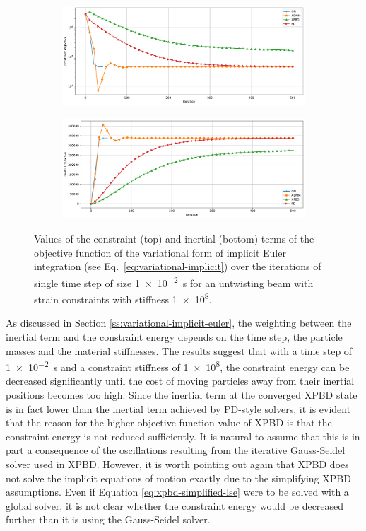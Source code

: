 \begin{figure}[h]
    \centering
    \begin{subfigure}{\textwidth}
        \includegraphics[width=\linewidth]{figures/strain_beam_untwist_constraintObjectives.pdf}
    \end{subfigure}
    \begin{subfigure}{\textwidth}
        \includegraphics[width=\linewidth]{figures/strain_beam_untwist_inertialObjectives.pdf}
    \end{subfigure}
    \caption{Values of the constraint (top) and inertial (bottom) terms of the objective function of the variational form of implicit Euler integration 
        (see Eq.\ \ref{eq:variational-implicit}) over the iterations of single time step of size \SI{1e-2}{\second} for an untwisting beam with strain 
    constraints with stiffness \num{1e8}.}
    \label{fig:strain-beam-untwist-objectives-split}
\end{figure}

As discussed in Section \ref{ss:variational-implicit-euler}, the weighting between the inertial term and the constraint energy depends on the time step, the particle masses 
and the material stiffnesses. The results suggest that with a time step of \SI{1e-2}{\second} and a constraint stiffness of \num{1e8}, the constraint energy can be 
decreased significantly until the cost of moving particles away from their inertial positions becomes too high. Since the inertial term at the converged XPBD state 
is in fact lower than the inertial term achieved by PD-style solvers, it is evident that the reason for the 
higher objective function value of XPBD is that the constraint energy is not reduced sufficiently. It is natural to assume that this 
is in part a consequence of the oscillations resulting from the iterative Gauss-Seidel solver used in XPBD. However, it is worth pointing out again that XPBD does not 
solve the implicit equations of motion exactly due to the simplifying XPBD assumptions. Even if Equation \ref{eq:xpbd-simplified-lse} were to be solved with a global solver,
it is not clear whether the constraint energy would be decreased further than it is using the Gauss-Seidel solver. 

